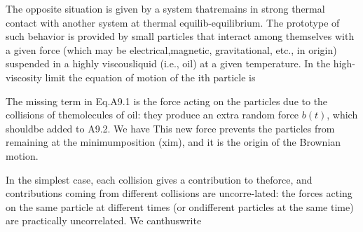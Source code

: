 \documentclass[../../main-notes.tex]{subfiles}
\begin{document}
The opposite situation is given by a system thatremains in strong thermal contact with another system at thermal equilib-equilibrium. 
The prototype of such behavior is provided by small particles that interact among themselves with a given force (which may be electrical,magnetic, gravitational, etc., in origin) suspended in a highly viscousliquid (i.e., oil) at a given temperature. 
In the high-viscosity limit the equation of motion of the ith particle is

 The missing term in Eq.A9.1 is the force acting on the particles due to the collisions of themolecules of oil: they produce an extra random force $b(t)$, which shouldbe added to A9.2. 
 We have
This new force prevents the particles from remaining at the minimumposition (xim), and it is the origin of the Brownian motion.

In the simplest case, each collision gives a contribution to theforce, and contributions coming from different collisions are uncorre-lated: the forces acting on the same particle at different times (or ondifferent particles at the same time) are practically uncorrelated. We canthuswrite
\end{document}
